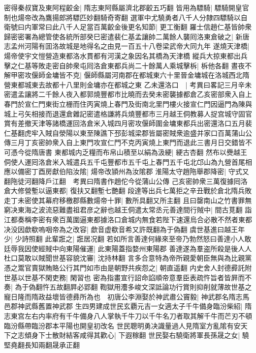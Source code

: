 密得秦叔寶及東阿程齩金|{
	隋志東阿縣屬濟北郡齩五巧翻}
皆用為驃騎|{
	驃騎開皇官制也煬帝改為鷹揚郎將驃匹妙翻騎奇寄翻}
選軍中尤驍勇者八千人分隸四驃騎以自衛號曰内軍常曰此八千人足當百萬齩金後更名知節|{
	更工衡翻}
羅士信趙仁基皆帥衆歸密密署為總管使各統所部癸巳密遣裴仁基孟讓帥二萬餘人襲囘洛東倉破之|{
	新唐志孟州河陽有囬洛故城是地得名之由見一百五十八卷梁武帝大同九年}
遂燒天津橋|{
	煬帝使宇文愷營造東都洛水貫都有河漢之象因名其橋為天津橋}
縱兵大掠東都出兵擊之仁基等敗走密自帥衆屯囘洛倉東都兵尚二十餘萬人乘城擊柝|{
	柝他各翻}
晝夜不解甲密攻偃師金墉皆不克|{
	偃師縣屬河南郡在都城東六十里晉金墉城在洛城西北隋營東都城東去故都十八里則金墉亦在都城之東}
乙未還洛口　|{
	考異曰畧記三月辛未密遣孟讓將二千餘人夜入都郭燒豐都市比曉而去癸未密襲據都倉乙亥密部衆入自上春門於宣仁門東街立栅而住丙寅燒上春門及街南北里門樓火接宣仁門因逼門為陳與城上弓矢相接而退還倉雜記密遣格謙將兵燒豐都市三月越王侗教募人捉宫城守固官賞有差撤天津等諸橋運回洛倉米入城四月密攻偃師圍金墉東都兵出密還洛口五月裴仁基翻虎牢入賊自滎陽以東至陳譙下邳彭城梁郡皆屬密賊衆逾盛并家口百萬蒲山公傳三月丁亥密帥衆入自上東門攻宣仁門不克丙寅燒上東門而退此三書月日交錯皆不可憑今從隋唐書}
東都城内乏糧而布帛山積至以絹為汲綆|{
	綆古杏翻}
然布以㸑越王侗使人運囘洛倉米入城遣兵五千屯豐都市五千屯上春門五千屯北邙山為九營首尾相應以備密丁酉房獻伯陷汝隂|{
	煬帝改頴州為汝隂郡}
淮陽太守趙陁舉郡降密|{
	守式又翻陁徒河翻降戶江翻　考異曰隋書作趙佗今從蒲山公傳}
己亥密帥衆三萬復據囘洛倉大修營塹以逼東都|{
	復扶又翻塹七艷翻}
段達等出兵七萬拒之辛丑戰於倉北隋兵敗走丁未密使其幕府移檄郡縣數煬帝十罪|{
	數所具翻又所主翻}
且曰罄南山之竹書罪無窮决東海之波流惡難盡祖君彦之辭也越王侗遣太常丞元善達間行賊中|{
	間古莧翻}
詣江都奏稱李密有衆百萬圍逼東都據洛口倉城内無食若陛下速還烏合必散不然者東都决没因歔欷嗚咽帝為之改容|{
	歔音虚欷音希又許既翻為于偽翻}
虞世基進曰越王年少|{
	少詩照翻}
此輩誑之|{
	誑居况翻}
若如所言善達何緣來至帝乃勃然怒曰善達小人敢廷辱我因使經賊中向東陽催運|{
	此東陽蓋指婺州東陽郡}
善達遂為羣盗所殺是後人人杜口莫敢以賊聞世基容貌沈審|{
	沈持林翻}
言多合意特為帝所親愛朝臣無與為比親黨憑之鬻官賣獄賄賂公行其門如市由是朝野共疾怨之|{
	朝直遥翻}
内史舍人封德彛託附世基以世基不閑吏務|{
	閑習也}
密為指畫宣行詔命諂順帝意羣臣表疏忤旨者皆屛而不奏|{
	為于偽翻忤五故翻屛必郢翻}
鞫獄用灋多峻文深詆論功行賞則抑削就薄故世基之寵日隆而隋政益壞皆德彞所為也　初唐公李淵娶於神武肅公竇毅|{
	神武郡名隋志馬邑郡神武縣舊置神武郡}
生四男建成世民玄覇元吉一女適太子千牛備身臨汾柴紹|{
	隋志東宫左右内率府有千牛備身八人掌執千牛刀以千牛名刀者取其解千牛而芒刃不頓臨汾縣帶臨汾郡本平陽也開皇初改名}
世民聰明勇决識量過人見隋室方亂隂有安天下之志傾身下士散財結客咸得其歡心|{
	下遐稼翻}
世民娶右驍衛將軍長孫晟之女|{
	驍堅堯翻長知兩翻晟承正翻}
